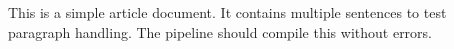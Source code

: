 \documentclass{article}
\begin{document}
This is a simple article document.
It contains multiple sentences to test paragraph handling.
The pipeline should compile this without errors.
\end{document}
